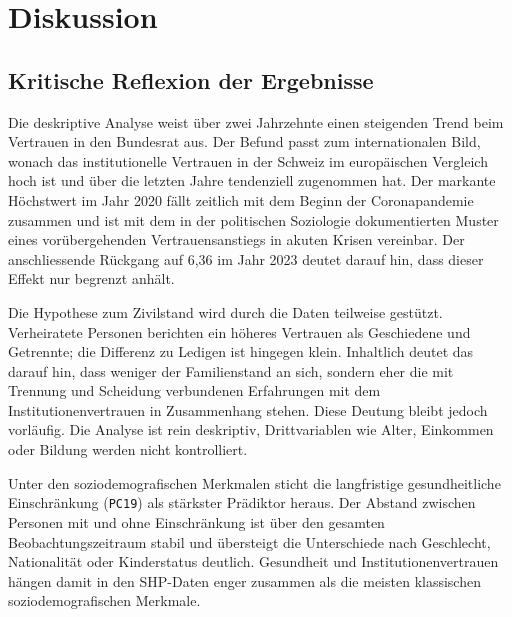 

\chapter{Diskussion}
\label{Chapter4}


\section{Kritische Reflexion der Ergebnisse}
\label{sec:reflexion}

Die deskriptive Analyse weist über zwei Jahrzehnte einen steigenden Trend beim
Vertrauen in den Bundesrat aus. Der Befund passt zum internationalen Bild, wonach das
institutionelle Vertrauen in der Schweiz im europäischen Vergleich hoch ist und über
die letzten Jahre tendenziell zugenommen hat. Der markante Höchstwert im Jahr 2020
fällt zeitlich mit dem Beginn der Coronapandemie zusammen und ist mit dem in der
politischen Soziologie dokumentierten Muster eines vorübergehenden
Vertrauensanstiegs in akuten Krisen vereinbar. Der anschliessende Rückgang auf
6{,}36 im Jahr 2023 deutet darauf hin, dass dieser Effekt nur begrenzt anhält.

Die Hypothese zum Zivilstand wird durch die Daten teilweise gestützt. Verheiratete
Personen berichten ein höheres Vertrauen als Geschiedene und Getrennte; die Differenz
zu Ledigen ist hingegen klein. Inhaltlich deutet das darauf hin, dass weniger der
Familienstand an sich, sondern eher die mit Trennung und Scheidung verbundenen
Erfahrungen mit dem Institutionenvertrauen in Zusammenhang stehen. Diese Deutung
bleibt jedoch vorläufig. Die Analyse ist rein deskriptiv, Drittvariablen wie Alter,
Einkommen oder Bildung werden nicht kontrolliert.

Unter den soziodemografischen Merkmalen sticht die langfristige gesundheitliche
Einschränkung (\texttt{PC19}) als stärkster Prädiktor heraus. Der Abstand zwischen
Personen mit und ohne Einschränkung ist über den gesamten Beobachtungszeitraum stabil
und übersteigt die Unterschiede nach Geschlecht, Nationalität oder Kinderstatus
deutlich. Gesundheit und Institutionenvertrauen hängen damit in den SHP-Daten enger
zusammen als die meisten klassischen soziodemografischen Merkmale.


